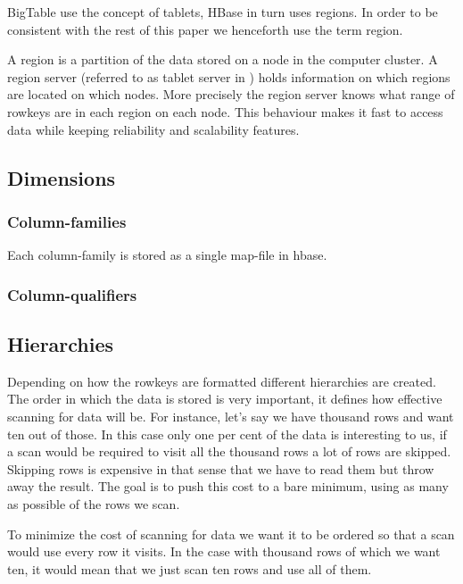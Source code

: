 \documentclass[a4paper,10pt]{book}
\begin{document}
BigTable use the concept of tablets, HBase in turn uses regions. In order
to be consistent with the rest of this paper we henceforth use the term
region.

A region is a partition of the data stored on a node in the computer
cluster. A region server (referred to as tablet server in \cite{bigtable})
holds information on which regions are located on which nodes. More
precisely the region server knows what range of rowkeys are in each region
on each node. This behaviour makes it fast to access data while keeping
reliability and scalability features.



\subsection{Dimensions}

\subsubsection{Column-families}

Each column-family is stored as a single map-file in hbase.


\subsubsection{Column-qualifiers}



\subsection{Hierarchies}

Depending on how the rowkeys are formatted different hierarchies are
created. The order in which the data is stored is very important, it
defines how effective scanning for data will be. For instance, let's say we
have thousand rows and want ten out of those. In this case only one per
cent of the data is interesting to us, if a scan would be required to visit
all the thousand rows a lot of rows are skipped. Skipping rows is expensive
in that sense that we have to read them but throw away the result. The goal
is to push this cost to a bare minimum, using as many as possible of the
rows we scan.

To minimize the cost of scanning for data we want it to be ordered so that
a scan would use every row it visits. In the case with thousand rows of
which we want ten, it would mean that we just scan ten rows and use all of
them.
\end{document}
